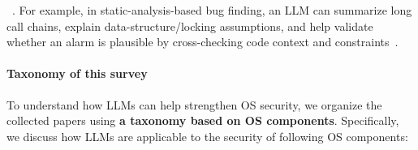 ~\cite{chen2021evaluating}.
For example, in static-analysis-based bug finding, an LLM can summarize long call chains, explain data-structure/locking assumptions, and help validate whether an alarm is plausible by cross-checking code context and constraints~\cite{wen2024automatically}.


\paragraph{Taxonomy of this survey} 
To understand how LLMs can help strengthen OS security, we organize the collected papers using \textbf{a taxonomy based on OS components}. 
Specifically, we discuss how LLMs are applicable to the security of following OS components:
